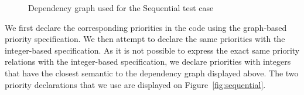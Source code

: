 \documentclass[11pt]{report}
\begin{document}
\begin{figure}[!ht]
      \caption{Dependency graph used for the Sequential test case}
      \label{fig:complex} 
\end{figure}

We first declare the corresponding priorities in the code using the graph-based priority specification. We then attempt to declare the same priorities with the integer-based specification. As it is not possible to express the exact same priority relations with the integer-based specification, we declare priorities with integers that have the closest semantic to the dependency graph displayed above. The two priority declarations that we use are displayed on Figure~\ref{fig:sequential}.
\end{document}
